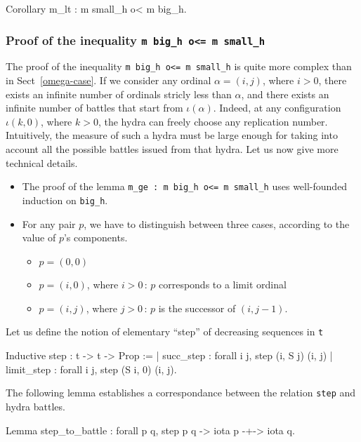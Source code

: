 \documentclass[a4paper]{book}
\begin{document}
\begin{Coqsrc}
Corollary m_lt : m small_h o< m big_h.
\end{Coqsrc}


\subsubsection{Proof of the inequality \texttt{m big\_h o<= m small\_h} }


The proof of the inequality \texttt{m big\_h o<= m small\_h} is quite more complex than in Sect~\ref{omega-case}.  If we consider any ordinal $\alpha=(i,j)$, where $i>0$, there exists an infinite number of
ordinals stricly less than $\alpha$, and there exists an infinite number of battles that start from
$\iota(\alpha)$. Indeed, at any configuration $\iota(k,0)$, where $k>0$, the hydra can freely choose any replication number. Intuitively, the measure of such a hydra must be large enough for taking into account
all the possible battles issued from that hydra.
Let us now give more technical details.

\begin{itemize}
\item The proof of the lemma \texttt{m\_ge : m big\_h  o<= m small\_h} uses well-founded induction on \texttt{big\_h}.

\item For any pair $p$, we have to distinguish between three cases, according to the value of $p$'s components.
  \begin{itemize}
  \item $p=(0,0)$
  \item $p=(i,0)$, where $i>0$\,: $p$ corresponds to a limit ordinal
  \item $p=(i,j)$, where $j>0$\,: $p$ is the successor of $(i,j-1)$.
  \end{itemize}
\end{itemize}


Let us define the notion of elementary ``step'' of decreasing sequences in
\texttt{t}


\begin{Coqsrc}
Inductive step : t -> t -> Prop :=
| succ_step : forall i j,  step (i, S j) (i, j)
| limit_step : forall i j, step (S i, 0) (i, j).
\end{Coqsrc}

The following lemma establishes a correspondance between the relation
\texttt{step} and hydra battles.

\begin{Coqsrc}
Lemma step_to_battle : forall p q, step p q -> iota p -+-> iota q.
\end{Coqsrc}
\end{document}
